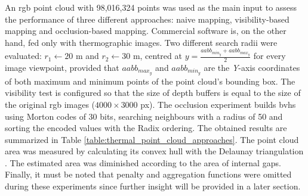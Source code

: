 An \acrshort{rgb} point cloud with 98,016,324 points was used as the main input to assess the performance of three different approaches: naive mapping, visibility-based mapping and occlusion-based mapping. Commercial software is, on the other hand, fed only with thermographic images. Two different search radii were evaluated: $r_1 \gets 20$ \si{\meter} and $r_2 \gets 30$ \si{\meter}, centred at $y = \frac{\textit{aabb}_{\textit{min}_{y}} + \textit{aabb}_{\textit{max}_{y}}}{2}$ for every image viewpoint, provided that $\textit{aabb}_{\textit{max}_{y}}$ and $\textit{aabb}_{\textit{min}_{y}}$ are the \textit{Y}-axis coordinates of both maximum and minimum points of the point cloud's bounding box. The visibility test is configured so that the size of depth buffers is equal to the size of the original \acrshort{rgb} images ($4000 \times 3000$ px). The occlusion experiment builds \acrshort{bvh}s using Morton codes of 30 bits, searching neighbours with a radius of 50 and sorting the encoded values with the Radix ordering. The obtained results are summarized in Table \ref{table:thermal_point_cloud_approaches}. The point cloud area was measured by calculating its convex hull with the Delaunay triangulation \cite{shewchuk_delaunay_2002}. The estimated area was diminished according to the area of internal gaps. Finally, it must be noted that penalty and aggregation functions were omitted during these experiments since further insight will be provided in a later section. 

